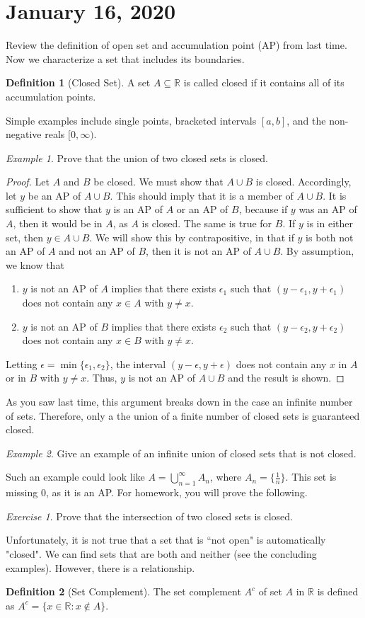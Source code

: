 \documentclass[11pt]{article}
\newcommand{\R}{\ensuremath{\mathbb R}}
\newcommand{\e}{\epsilon}
\newcommand{\sse}{\subseteq}
\theoremstyle{plain}
\theoremstyle{definition}
\newtheorem{defi}{Definition}[section]
\theoremstyle{remark}
\newtheorem{exm}{Example}[section]
\newtheorem{exc}{Exercise}[section]
\begin{document}
\section{January 16, 2020}

Review the definition of open set and accumulation point (AP) from last time. Now we characterize a set that includes its boundaries.
\begin{defi}[Closed Set]
    A set $A \sse \R$ is called closed if it contains all of its accumulation points.
\end{defi}
Simple examples include single points, bracketed intervals $[a, b]$, and the non-negative reals $[0, \infty)$.
\begin{exm}
    Prove that the union of two closed sets is closed.
\end{exm}
\begin{proof}
    Let $A$ and $B$ be closed. We must show that $A \cup B$ is closed. Accordingly, let $y$ be an AP of $A \cup B$. This should imply that it is a member of $A \cup B$. It is sufficient to show that $y$ is an AP of $A$ or an AP of $B$, because if $y$ was an AP of $A$, then it would be in $A$, as $A$ is closed. The same is true for $B$. If $y$ is in either set, then $y \in A \cup B$. We will show this by contrapositive, in that if $y$ is both not an AP of $A$ and not an AP of $B$, then it is not an AP of $A \cup B$. By assumption, we know that
    \begin{enumerate}
        \item $y$ is not an AP of $A$ implies that there exists $\e_1$ such that $(y - \e_1, y + \e_1)$ does not contain any $x \in A$ with $y \neq x$.
        \item $y$ is not an AP of $B$ implies that there exists $\e_2$ such that $(y - \e_2, y + \e_2)$ does not contain any $x \in B$ with $y \neq x$.
    \end{enumerate}
    Letting $\e = \min\{\e_1, \e_2\}$, the interval $(y - \e, y + \e)$ does not contain any $x$ in $A$ or in $B$ with $y \neq x$. Thus, $y$ is not an AP of $A \cup B$ and the result is shown.
\end{proof}
As you saw last time, this argument breaks down in the case an infinite number of sets. Therefore, only a the union of a finite number of closed sets is guaranteed closed.
\begin{exm}
    Give an example of an infinite union of closed sets that is not closed.
\end{exm}
Such an example could look like $A = \bigcup_{n=1}^\infty A_n$, where $A_n = \{\frac{1}{n}\}$. This set is missing $0$, as it is an AP. For homework, you will prove the following.
\begin{exc}
    Prove that the intersection of two closed sets is closed.
\end{exc}
Unfortunately, it is not true that a set that is ``not open" is automatically "closed". We can find sets that are both and neither (see the concluding examples). However, there is a relationship.
\begin{defi}[Set Complement]
    The set complement $A^c$ of set $A$ in $\R$ is defined as $A^c = \{x \in \R: x \notin A\}$.
\end{defi}
\end{document}
